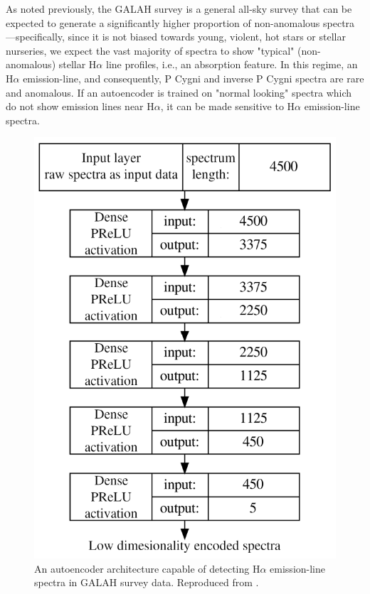 As noted previously, the GALAH survey is a general all-sky survey that can be expected to generate a significantly higher proportion of non-anomalous spectra—specifically, since it is not biased towards young, violent, hot stars or stellar nurseries, we expect the vast majority of spectra to show "typical" (non-anomalous) stellar H$\alpha$ line profiles, i.e., an absorption feature. In this regime, an H$\alpha$ emission-line, and consequently, P Cygni and inverse P Cygni spectra are rare and anomalous. If an autoencoder is trained on "normal looking" spectra which do not show emission lines near H$\alpha$, it can be made sensitive to H$\alpha$ emission-line spectra. 

\begin{figure}[!htb]
\centering
\includegraphics[scale=0.45]{figures/autoencoder.png}
\caption{An autoencoder architecture capable of detecting H$\alpha$ emission-line spectra in GALAH survey data. Reproduced from \citet{vcotar2021galah}.}
\label{fig2.7}
\end{figure}

